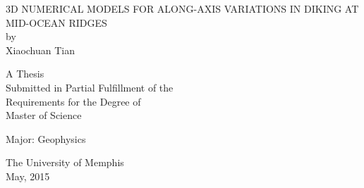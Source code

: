 
\thispagestyle{empty}  %


\begin{center}


\uppercase{3D Numerical Models for Along-axis Variations in Diking at Mid-Ocean Ridges}
\\
\vspace{10pt}
by
\vspace{10pt}
\\
Xiaochuan Tian
\\
\vspace{100pt}


A Thesis
\\
Submitted in Partial Fulfillment of the 
\\
Requirements for the Degree of 
\\
Master of Science
\\
\vspace{35pt}

Major: Geophysics
\\

\vspace{120pt}

The University of Memphis
\\

May, 2015

\end{center}

\restoregeometry
